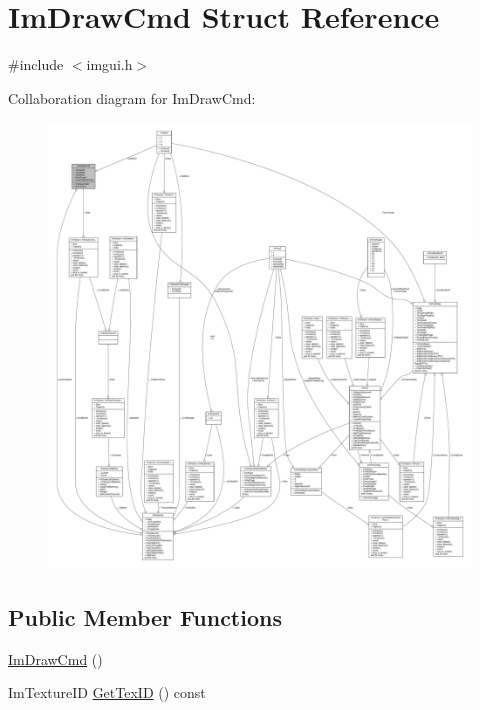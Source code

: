 \hypertarget{structImDrawCmd}{}\section{Im\+Draw\+Cmd Struct Reference}
\label{structImDrawCmd}


{\ttfamily \#include $<$imgui.\+h$>$}



Collaboration diagram for Im\+Draw\+Cmd\+:
\nopagebreak
\begin{figure}[H]
\begin{center}
\leavevmode
\includegraphics[width=350pt]{structImDrawCmd__coll__graph}
\end{center}
\end{figure}
\subsection*{Public Member Functions}
\begin{DoxyCompactItemize}
\item 
\hyperlink{structImDrawCmd_adcf30cacb8e6b747e90000603c87f1e3}{Im\+Draw\+Cmd} ()
\item 
Im\+Texture\+ID \hyperlink{structImDrawCmd_a8ba7df6d136db6e33d850acc9291224f}{Get\+Tex\+ID} () const
\end{DoxyCompactItemize}
